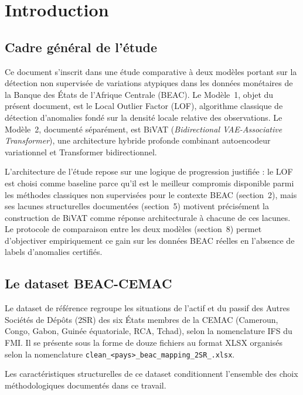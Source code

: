 \documentclass[12pt,a4paper]{article}
\begin{document}
\tableofcontents
\newpage

\section{Introduction}

\subsection{Cadre général de l'étude}

Ce document s'inscrit dans une étude comparative à deux modèles portant sur
la détection non supervisée de variations atypiques dans les données monétaires
de la Banque des États de l'Afrique Centrale (BEAC). Le Modèle~1, objet du
présent document, est le Local Outlier Factor (LOF), algorithme classique de
détection d'anomalies fondé sur la densité locale relative des observations.
Le Modèle~2, documenté séparément, est BiVAT (\textit{Bidirectional
VAE-Associative Transformer}), une architecture hybride profonde combinant
autoencodeur variationnel et Transformer bidirectionnel.

L'architecture de l'étude repose sur une logique de progression justifiée :
le LOF est choisi comme baseline parce qu'il est le meilleur compromis
disponible parmi les méthodes classiques non supervisées pour le contexte
BEAC (section~2), mais ses lacunes structurelles documentées (section~5)
motivent précisément la construction de BiVAT comme réponse architecturale
à chacune de ces lacunes. Le protocole de comparaison entre les deux modèles
(section~8) permet d'objectiver empiriquement ce gain sur les données BEAC
réelles en l'absence de labels d'anomalies certifiés.

\subsection{Le dataset BEAC-CEMAC}

Le dataset de référence regroupe les situations de l'actif et du passif des
Autres Sociétés de Dépôts (2SR) des six États membres de la CEMAC (Cameroun,
Congo, Gabon, Guinée équatoriale, RCA, Tchad), selon la nomenclature IFS du
FMI. Il se présente sous la forme de douze fichiers au format XLSX organisés
selon la nomenclature
\texttt{clean\_<pays>\_beac\_mapping\_2SR\_<Actif|Passif>.xlsx}.

Les caractéristiques structurelles de ce dataset conditionnent l'ensemble
des choix méthodologiques documentés dans ce travail.
\end{document}
